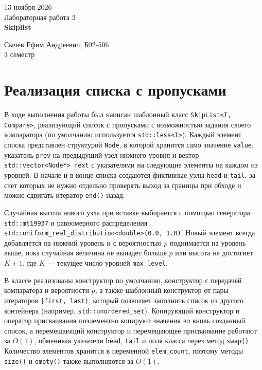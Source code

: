 \documentclass[12 pt, a4paper]{article}%
\title{}
\author{}
\date{}
\begin{document}
	\begin{titlepage} %
		\begin{center}
			\large 13 ноября 2026\\
			\vspace{9.0cm}
			{\LARGE {Лабораторная работа 2\\
					\textbf{Skiplist}}\\}
			\vspace{9.5cm}
			
			\large Сычев Ефим Андреевич, Б02-506\\
			\large 3 семестр
		\end{center}
	\end{titlepage}
	
	\newpage
	
	\section{Реализация списка с пропусками}

В ходе выполнения работы был написан шаблонный класс \texttt{SkipList<T, Compare>}, реализующий список с пропусками с возможностью задания своего компаратора (по умолчанию используется \texttt{std::less<T>}). Каждый элемент списка представлен структурой \texttt{Node}, в которой хранится само значение \texttt{value}, указатель \texttt{prev} на предыдущий узел нижнего уровня и вектор \texttt{std::vector<Node*> next} с указателями на следующие элементы на каждом из уровней. В начале и в конце списка создаются фиктивные узлы \texttt{head} и \texttt{tail}, за счет которых не нужно отдельно проверять выход за границы при обходе и можно сдвигать итератор \texttt{end()} назад.

Случайная высота нового узла при вставке выбирается с помощью генератора \texttt{std::mt19937} и равномерного распределения \texttt{std::uniform\_real\_distribution<double>(0.0, 1.0)}. Новый элемент всегда добавляется на нижний уровень и с вероятностью $p$ поднимается на уровень выше, пока случайная величина не выпадет больше $p$ или высота не достигнет $K + 1$, где $K$ --- текущее число уровней \texttt{max\_level}.

В классе реализованы конструктор по умолчанию, конструктор с передачей компаратора и вероятности $p$, а также шаблонный конструктор от пары итераторов \texttt{[first, last)}, который позволяет заполнить список из другого контейнера (например, \texttt{std::unordered\_set}). Копирующий конструктор и оператор присваивания поэлементно копируют значения во вновь созданный список, а перемещающий конструктор и перемещающее присваивание работают за $O(1)$, обменивая указатели \texttt{head}, \texttt{tail} и поля класса через метод \texttt{swap()}. Количество элементов хранится в переменной \texttt{elem\_count}, поэтому методы \texttt{size()} и \texttt{empty()} также выполняются за $O(1)$.
\end{document}
